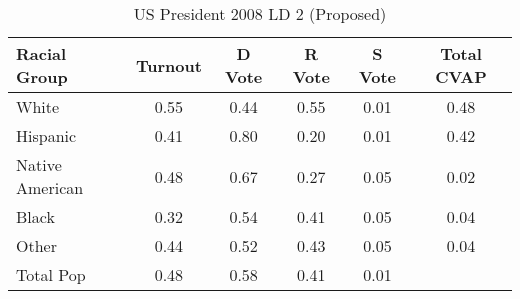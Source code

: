 \begin{table}[htb]
\begin{center}
\caption{US President 2008 LD 2 (Proposed)}
\label{pres08_cvap_ld_2}
\begin{tabular}{lccccc}
  \hline
Racial Group & Turnout & D Vote & R Vote & S Vote & Total CVAP \\ 
  \hline
White & 0.55 & 0.44 & 0.55 & 0.01 & 0.48 \\ 
  Hispanic & 0.41 & 0.80 & 0.20 & 0.01 & 0.42 \\ 
  Native American & 0.48 & 0.67 & 0.27 & 0.05 & 0.02 \\ 
  Black & 0.32 & 0.54 & 0.41 & 0.05 & 0.04 \\ 
  Other & 0.44 & 0.52 & 0.43 & 0.05 & 0.04 \\ 
  Total Pop & 0.48 & 0.58 & 0.41 & 0.01 &  \\ 
   \hline
\end{tabular}
\end{center}
\end{table}

